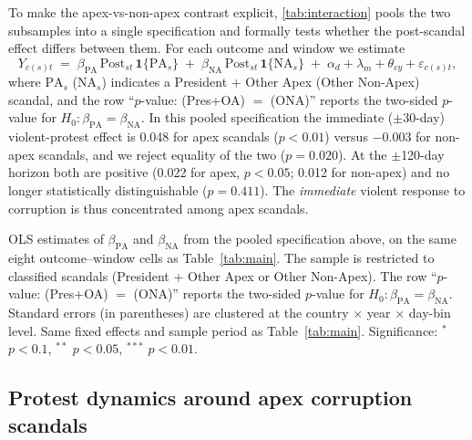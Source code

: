 \documentclass[11pt]{article}
\let\mathbetasym\beta
\renewcommand{\beta}{\ensuremath{\mathbetasym}}
\begin{document}
To make the apex-vs-non-apex contrast explicit, \autoref{tab:interaction} pools the two subsamples into a single specification and formally tests whether the post-scandal effect differs between them. For each outcome and window we estimate
\begin{equation*}
    Y_{c(s)t} \;=\; \beta_{\text{PA}}\, \mathrm{Post}_{st}\, \mathbf{1}\{\text{PA}_s\}
    \;+\; \beta_{\text{NA}}\, \mathrm{Post}_{st}\, \mathbf{1}\{\text{NA}_s\}
    \;+\; \alpha_d + \lambda_m + \theta_{cy} + \varepsilon_{c(s)t},
\end{equation*}
where $\mathrm{PA}_s$ ($\mathrm{NA}_s$) indicates a President + Other Apex (Other Non-Apex) scandal, and the row ``$p$-value: (Pres+OA) $=$ (ONA)'' reports the two-sided $p$-value for $H_0:\beta_{\text{PA}}=\beta_{\text{NA}}$. In this pooled specification the immediate ($\pm$30-day) violent-protest effect is 0.048 for apex scandals ($p<0.01$) versus $-0.003$ for non-apex scandals, and we reject equality of the two ($p = 0.020$). At the $\pm$120-day horizon both are positive (0.022 for apex, $p<0.05$; 0.012 for non-apex) and no longer statistically distinguishable ($p = 0.411$). The \emph{immediate} violent response to corruption is thus concentrated among apex scandals.

\begin{table}[htb!]
    \caption{Pooled test: (President + Other Apex) vs.\ Other Non-Apex.}
    \label{tab:interaction}
    \begin{center}
        \scriptsize{}
    \end{center}
    \footnotesize{OLS estimates of $\beta_{\text{PA}}$ and $\beta_{\text{NA}}$ from the pooled specification above, on the same eight outcome--window cells as Table~\ref{tab:main}. The sample is restricted to classified scandals (President + Other Apex or Other Non-Apex). The row ``$p$-value: (Pres+OA) $=$ (ONA)'' reports the two-sided $p$-value for $H_0:\beta_{\text{PA}}=\beta_{\text{NA}}$. Standard errors (in parentheses) are clustered at the country $\times$ year $\times$ day-bin level. Same fixed effects and sample period as Table~\ref{tab:main}. Significance: $^{*}$ $p<0.1$, $^{**}$ $p<0.05$, $^{***}$ $p<0.01$.}
\end{table}

\subsection{Protest dynamics around apex corruption scandals}
\end{document}
